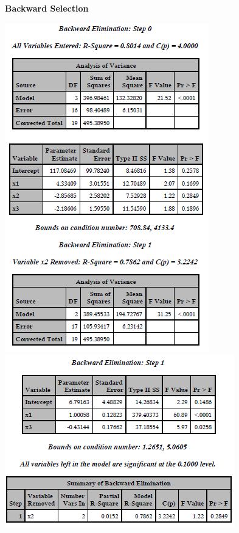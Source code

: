 \textbf{Backward Selection}
\begin{flushleft}
\includegraphics[scale=0.8]{bodyfatbackward1}\\
\includegraphics[scale=0.8]{bodyfatbackward2}
\end{flushleft}

\newpage

